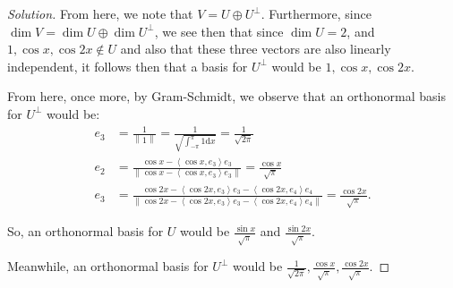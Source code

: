 \documentclass{article}
\newenvironment{solution}{\begin{proof}[Solution]}{\end{proof}}
\newcommand{\norm}[1]{\left\lVert{#1}\right\rVert}
\newcommand{\innerproduct}[2]{\left\langle{#1}, {#2}\right\rangle}
\begin{document}
\begin{solution}
		From here, we note that $V = U \oplus U^{\perp}$. Furthermore, since $\dim V = \dim U \oplus \dim U^{\perp}$, we see then that since $\dim U = 2$, and $1, \cos x, \cos 2x \not\in U$ and also that these three vectors are also linearly independent, it follows then that a basis for $U^{\perp}$ would be $1, \cos x, \cos 2x$.
		
		From here, once more, by Gram-Schmidt, we observe that an orthonormal basis for $U^{\perp}$ would be:
		\begin{align*}
			e_{3} &= \frac{1}{\norm{1}} = \frac{1}{\sqrt{\int_{-\pi}^{\pi} 1 \mathrm dx}} = \frac{1}{\sqrt{2\pi}} \\
			e_{2} &= \frac{\cos x - \innerproduct{\cos x}{e_{3}}e_{3}}{\norm{\cos x - \innerproduct{\cos x}{e_{3}}e_{3}}} = \frac{\cos x}{\sqrt \pi} \\
			e_{3} &= \frac{\cos 2x - \innerproduct{\cos 2x}{e_{3}}e_{3} - \innerproduct{\cos 2x}{e_{4}}e_{4}}{\norm{\cos 2x - \innerproduct{\cos 2x}{e_{3}}e_{3} - \innerproduct{\cos 2x}{e_{4}}e_{4}}} = \frac{\cos 2x}{\sqrt \pi}.
		\end{align*}
		
		So, an orthonormal basis for $U$ would be $\frac{\sin x}{\sqrt{\pi}}$ and $\frac{\sin 2x}{\sqrt \pi}$.
		
		Meanwhile, an orthonormal basis for $U^{\perp}$ would be $\frac{1}{\sqrt{2\pi}}, \frac{\cos x}{\sqrt{\pi}}, \frac{\cos 2x}{\sqrt{\pi}}$.
	\end{solution}
	
	\newpage
	
\end{document}
